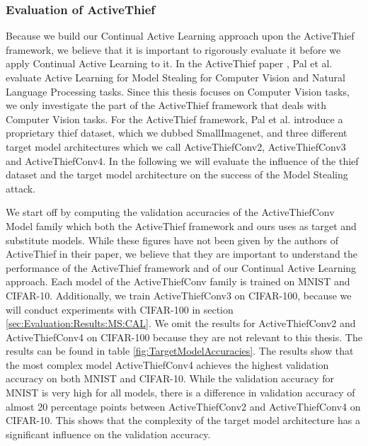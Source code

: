 \subsubsection{Evaluation of ActiveThief}
\label{sec:Evaluation:Results:MS:ActiveThief}
Because we build our Continual Active Learning approach upon the ActiveThief framework, we believe that it is important to rigorously evaluate it before we apply Continual Active Learning to it. In the ActiveThief paper \cite{pal2020activethief}, Pal et al. evaluate Active Learning
for Model Stealing for Computer Vision and Natural Language Processing tasks. Since this thesis focuses on Computer Vision tasks, we only investigate the part of the ActiveThief framework that deals with Computer Vision tasks. For the ActiveThief framework, Pal et al. introduce a
proprietary thief dataset, which we dubbed SmallImagenet, and three different target model architectures which we call ActiveThiefConv2, ActiveThiefConv3 and ActiveThiefConv4. In the following we will evaluate the influence of the thief dataset and the target model architecture on
the success of the Model Stealing attack. \par
We start off by computing the validation accuracies of the ActiveThiefConv Model family which both the ActiveThief framework and ours uses as target and substitute models. While these figures have not been given by the authors of ActiveThief in their paper, we believe that they are
important to understand the performance of the ActiveThief framework and of our Continual Active Learning approach. Each model of the ActiveThiefConv family is trained on MNIST and CIFAR-10. Additionally, we train ActiveThiefConv3 on CIFAR-100, because we will conduct experiments
with CIFAR-100 in section \ref{sec:Evaluation:Results:MS:CAL}. We omit the results for ActiveThiefConv2 and ActiveThiefConv4 on CIFAR-100 because they are not relevant to this thesis. The results can be found in table \ref{fig:TargetModelAccuracies}. The results show that the
most complex model ActiveThiefConv4 achieves the highest validation accuracy on both MNIST and CIFAR-10. While the validation accuracy for MNIST is very high for all models, there is a difference in validation accuracy of almost 20 percentage points between ActiveThiefConv2 and
ActiveThiefConv4 on CIFAR-10. This shows that the complexity of the target model architecture has a significant influence on the validation accuracy. \par

